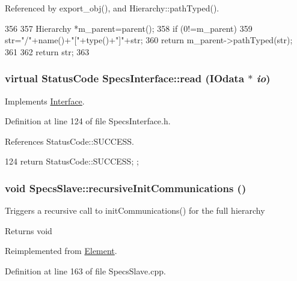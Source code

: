 Referenced by export\_\-obj(), and Hierarchy::pathTyped().


\begin{DoxyCode}
356                                            {
357   Hierarchy *m_parent=parent();
358   if (0!=m_parent){
359     str="/"+name()+"["+type()+"]"+str;
360     return m_parent->pathTyped(str);
361   }
362   return str;
363 }
\end{DoxyCode}
\hypertarget{classSpecsInterface_a6f1c8ca420f08c8fca9347ca743087c5}{
\subsubsection[{read}]{\setlength{\rightskip}{0pt plus 5cm}virtual {\bf StatusCode} SpecsInterface::read ({\bf IOdata} $\ast$ {\em io})}}
\label{classSpecsInterface_a6f1c8ca420f08c8fca9347ca743087c5}


Implements \hyperlink{classInterface_a99136b67c8e6cbcaa0477c36940ac2ef}{Interface}.

Definition at line 124 of file SpecsInterface.h.

References StatusCode::SUCCESS.


\begin{DoxyCode}
124 { return StatusCode::SUCCESS; };
\end{DoxyCode}
\hypertarget{classSpecsSlave_a347b94c2ba660ccde6927fe72590a1bc}{
\subsubsection[{recursiveInitCommunications}]{\setlength{\rightskip}{0pt plus 5cm}void SpecsSlave::recursiveInitCommunications ()}}
\label{classSpecsSlave_a347b94c2ba660ccde6927fe72590a1bc}
Triggers a recursive call to initCommunications() for the full hierarchy

\begin{DoxyReturn}{Returns}
void 
\end{DoxyReturn}


Reimplemented from \hyperlink{classElement_a82119ed37dff76508a2746a853ec35ba}{Element}.

Definition at line 163 of file SpecsSlave.cpp.

